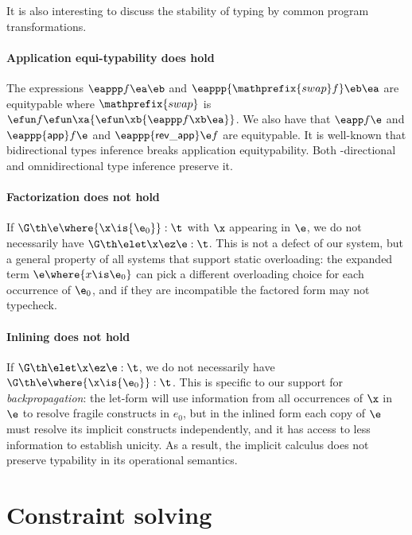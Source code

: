\documentclass[acmsmall,screen,nonacm%
\Anonymous{,anonymous}{}%
\Final{}{,review}%
]{acmart}
\begin{document}
\begin{version}{}
It is also interesting to discuss the stability of typing by common program
transformations.

\paragraph{Application equi-typability does hold}

\newcommand {\eswap}{{\mathprefix {swap}}}
The expressions $\eappp f \ea \eb$ and $\eappp {\eswap f} \eb \ea$ are
equitypable where $\eswap$ is
$\efun f {\efun \xa {\efun \xb {\eappp f \xb \ea}}}$. We also have
that $\eapp f \e$ and $\eappp {\mathsf{app}} f \e$ and
$\eappp {\mathsf{rev\_app}} \e f$ are equitypable.
It is well-known that
bidirectional types inference breaks application
equitypability. Both \geninst-directional and omnidirectional
type inference preserve it.

\paragraph{Factorization does not hold} If $\G \th \e \where {\x \is {\e_0}}
: \t$ with $\x$ appearing in $\e$, we do not necessarily have $\G \th \elet \x
\ez \e : \t$. This is not a defect of our system, but a general property of
all systems that support static overloading: the expanded term $\e \where {x
\is \e_0}$ can pick a different overloading choice for each occurrence of
$\e_0$, and if they are incompatible the factored form may not typecheck.

\paragraph{Inlining does not hold} If $\G \th \elet \x \ez \e : \t$, we do
not necessarily have $\G \th \e \where {\x \is {\e_0}} : \t$. This is
specific to our support for \emph{backpropagation}: the let-form will use
information from all occurrences of $\x$ in $\e$ to resolve fragile
constructs in $e_0$, but in the inlined form each copy of $\e$ must resolve
its implicit constructs independently, and it has access to less information
to establish unicity. As a result, the implicit \OML calculus does not
preserve typability in its operational semantics.

\end{version}

\section{Constraint solving}
\label{sec:solving}
\end{document}
